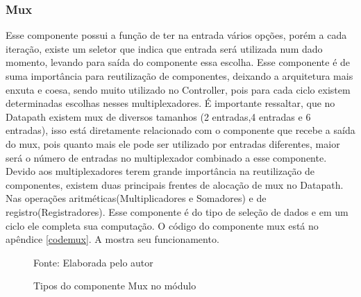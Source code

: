 \subsubsection{Mux}
Esse componente possui a função de ter na entrada vários opções, porém a cada iteração, existe um seletor que indica que entrada será utilizada num dado momento, levando para saída do componente essa escolha. Esse componente é de suma importância para reutilização de componentes, deixando a arquitetura mais enxuta e coesa, sendo muito utilizado no Controller, pois para cada ciclo existem determinadas escolhas nesses multiplexadores. É importante ressaltar, que no Datapath existem mux de diversos tamanhos (2 entradas,4 entradas e 6 entradas), isso está diretamente relacionado com o componente que recebe a saída do mux, pois quanto mais ele pode ser utilizado por entradas diferentes, maior será o número de entradas no multiplexador combinado a esse componente. Devido aos multiplexadores terem grande importância na reutilização de componentes, existem duas principais frentes de alocação de mux no Datapath. Nas operações aritméticas(Multiplicadores e Somadores) e de registro(Registradores). Esse componente é do tipo de seleção de dados e em um ciclo ele completa sua computação. O código do componente mux está no apêndice \ref{codemux}.	A  mostra seu funcionamento.

\begin{figure}[H]
	\caption{Tipos do componente Mux no módulo 	}
	\centering
	\quad %
	\quad %
	
	{Fonte: Elaborada pelo autor}
	\label{fig01}
\end{figure}

